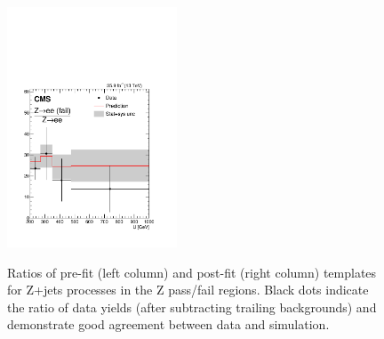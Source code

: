 \begin{figure}
\includegraphics[width=0.45\textwidth]{figures/pullsImpact/ratio_zee_fail_zee_shapes_fit_b.pdf}\\
\caption{Ratios of pre-fit (left column) and post-fit (right column) templates for Z+jets processes in the Z pass/fail regions. Black dots indicate the ratio of data yields (after subtracting trailing backgrounds) and demonstrate good agreement between data and simulation.}
\label{wwratios}
\end{figure}

\clearpage

